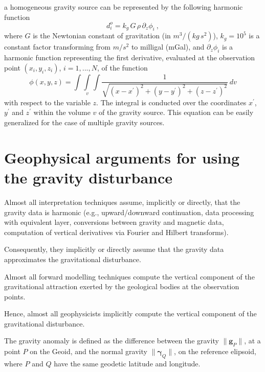 \documentclass[paper,twocolumn,twoside]{geophysics}
\begin{document}
a homogeneous gravity source can be represented 
by the following harmonic function
\begin{equation}
d^{o}_{i} = k_{g} \, G \, \rho \, \partial_{z} \phi_{i} \: ,
\label{eq:gz-local}
\end{equation}
where $G$ is the Newtonian constant of gravitation
(in $m^{3} / (kg \, s^{2})$),
$k_{g} = 10^{5}$ is a constant factor
transforming from $m/s^{2}$ to milligal (mGal),
and $\partial_{z} \phi_{i}$ is a harmonic function representing the first 
derivative, evaluated at the observation point $(x_{i},y_{i},z_{i})$, 
$i = 1, ..., N$, of the function 
\begin{equation}
\phi(x,y,z) = \int\int\limits_{v}\int \frac{1}{\sqrt{(x - x^{\prime})^{2} + 
(y - y^{\prime})^{2} + (z - z^{\prime})^{2}}} \: dv
\label{eq:phi}
\end{equation}
with respect to the variable $z$. The 
integral is conducted over the coordinates $x^{\prime}$, $y^{\prime}$ 
and $z^{\prime}$ within the volume $v$ of the gravity source.
This equation can be easily generalized for the case
of multiple gravity sources.

\section{Geophysical arguments for using the gravity disturbance}

Almost all interpretation techniques assume, implicitly or
directly, that the gravity data is harmonic (e.g., 
upward/downward continuation, 
data processing with equivalent layer,
conversions between gravity and magnetic data,
computation of vertical derivatives via Fourier and Hilbert
transforms).


Consequently, they implicitly or directly assume that
the gravity data approximates the gravitational disturbance.


Almost all forward modelling techniques compute
the vertical component of the gravitational attraction 
exerted by the geological bodies at the observation points.


Hence, almost all geophysicists implicitly compute 
the vertical component of the gravitational disturbance.


The gravity anomaly is defined as the difference between 
the gravity $\| \mathbf{g}_{P} \|$, at a point $P$ on the
Geoid, and the normal gravity $\| \boldsymbol{\gamma}_{Q} \|$,
on the reference elipsoid, where $P$ and $Q$ have the same
geodetic latitude and longitude.
\end{document}
